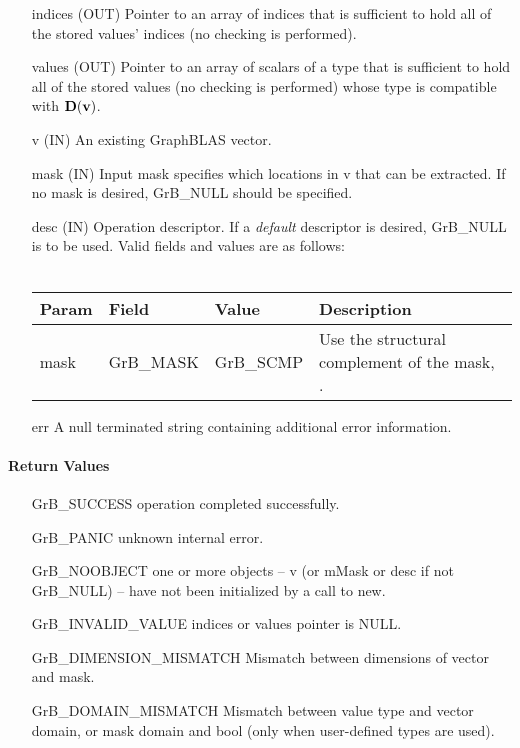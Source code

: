 \begin{itemize}[leftmargin=1.1in]
    \item[{\sf indices}] ({\sf OUT}) Pointer to an array of indices that is sufficient to
                        hold all of the stored values' indices (no checking is performed).
    \item[{\sf values}] ({\sf OUT}) Pointer to an array of scalars of a type that is sufficient to
                        hold all of the stored values (no checking is performed) whose
                        type is compatible with $\bold{D}({\bf v})$.
    \item[{\sf v}]      ({\sf IN})  An existing GraphBLAS vector.
    \item[{\sf mask}]   ({\sf IN})  Input mask specifies which locations in
                        {\sf v} that can be extracted.  If no mask is desired,
                        {\sf GrB\_NULL} should be specified.
    \item[{\sf desc}]   ({\sf IN}) Operation descriptor. If a
    \emph{default} descriptor is desired, {\sf GrB\_NULL} is to be
    used.  Valid fields and values are as follows: \\ ~\\
    \begin{tabular}{lllp{2.5in}}
    Param & Field  & Value & Description \\
    \hline
    {\sf mask}  & {\sf GrB\_MASK} & {\sf GrB\_SCMP}   & Use the structural complement of the mask, . \\
    \end{tabular}
    \item[{\sf err}]     A null terminated string containing additional error information.
\end{itemize}

\paragraph{Return Values}

\begin{itemize}[leftmargin=2.1in]
\item[{\sf GrB\_SUCCESS}]     operation completed successfully.
\item[{\sf GrB\_PANIC}]       unknown internal error.
\item[{\sf GrB\_NOOBJECT}]    one or more objects -- {\sf v} (or {\sf mMask} or {\sf desc} if not {\sf GrB\_NULL}) -- have not been initialized by a call to {\sf new}.
\item[{\sf GrB\_INVALID\_VALUE}]  {\sf indices} or {\sf values} pointer is {\sf NULL}.
\item[\sf GrB\_DIMENSION\_MISMATCH]  
                       Mismatch between dimensions of vector and mask. 
\item[\sf GrB\_DOMAIN\_MISMATCH]  
                       Mismatch between value type and vector domain, or mask domain and {\sf bool} (only when user-defined types are used).
\end{itemize}



